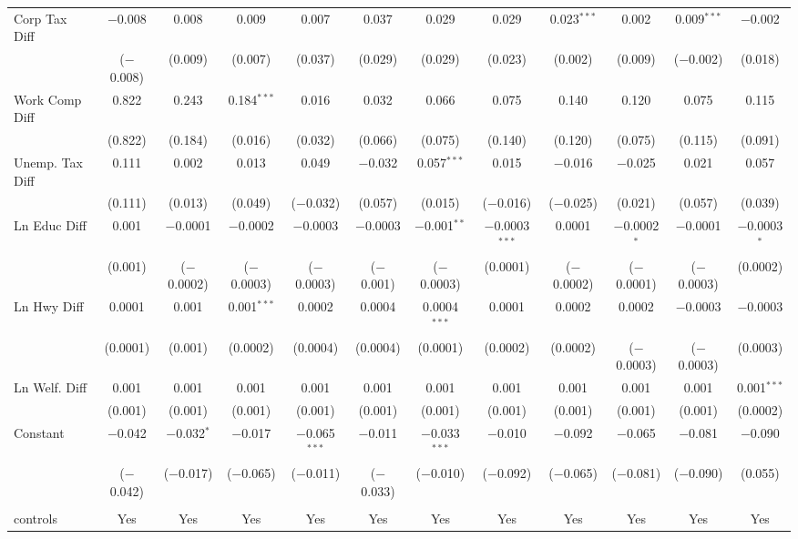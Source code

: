 \begin{table}[!htbp]
\begin{tabular}{@{\extracolsep{5pt}}lccccccccccc}
  Corp Tax Diff & $-$0.008 & 0.008 & 0.009 & 0.007 & 0.037 & 0.029 & 0.029 & 0.023$^{***}$ & 0.002 & 0.009$^{***}$ & $-$0.002 \\ 
  & ($-$0.008) & (0.009) & (0.007) & (0.037) & (0.029) & (0.029) & (0.023) & (0.002) & (0.009) & ($-$0.002) & (0.018) \\ 
  Work Comp Diff & 0.822 & 0.243 & 0.184$^{***}$ & 0.016 & 0.032 & 0.066 & 0.075 & 0.140 & 0.120 & 0.075 & 0.115 \\ 
  & (0.822) & (0.184) & (0.016) & (0.032) & (0.066) & (0.075) & (0.140) & (0.120) & (0.075) & (0.115) & (0.091) \\ 
  Unemp. Tax Diff & 0.111 & 0.002 & 0.013 & 0.049 & $-$0.032 & 0.057$^{***}$ & 0.015 & $-$0.016 & $-$0.025 & 0.021 & 0.057 \\ 
  & (0.111) & (0.013) & (0.049) & ($-$0.032) & (0.057) & (0.015) & ($-$0.016) & ($-$0.025) & (0.021) & (0.057) & (0.039) \\ 
  Ln Educ Diff & 0.001 & $-$0.0001 & $-$0.0002 & $-$0.0003 & $-$0.0003 & $-$0.001$^{**}$ & $-$0.0003$^{***}$ & 0.0001 & $-$0.0002$^{*}$ & $-$0.0001 & $-$0.0003$^{*}$ \\ 
  & (0.001) & ($-$0.0002) & ($-$0.0003) & ($-$0.0003) & ($-$0.001) & ($-$0.0003) & (0.0001) & ($-$0.0002) & ($-$0.0001) & ($-$0.0003) & (0.0002) \\ 
  Ln Hwy Diff & 0.0001 & 0.001 & 0.001$^{***}$ & 0.0002 & 0.0004 & 0.0004$^{***}$ & 0.0001 & 0.0002 & 0.0002 & $-$0.0003 & $-$0.0003 \\ 
  & (0.0001) & (0.001) & (0.0002) & (0.0004) & (0.0004) & (0.0001) & (0.0002) & (0.0002) & ($-$0.0003) & ($-$0.0003) & (0.0003) \\ 
  Ln Welf. Diff & 0.001 & 0.001 & 0.001 & 0.001 & 0.001 & 0.001 & 0.001 & 0.001 & 0.001 & 0.001 & 0.001$^{***}$ \\ 
  & (0.001) & (0.001) & (0.001) & (0.001) & (0.001) & (0.001) & (0.001) & (0.001) & (0.001) & (0.001) & (0.0002) \\ 
  Constant & $-$0.042 & $-$0.032$^{*}$ & $-$0.017 & $-$0.065$^{***}$ & $-$0.011 & $-$0.033$^{***}$ & $-$0.010 & $-$0.092 & $-$0.065 & $-$0.081 & $-$0.090 \\ 
  & ($-$0.042) & ($-$0.017) & ($-$0.065) & ($-$0.011) & ($-$0.033) & ($-$0.010) & ($-$0.092) & ($-$0.065) & ($-$0.081) & ($-$0.090) & (0.055) \\ 
 \hline \\[-1.8ex] 
controls & Yes & Yes & Yes & Yes & Yes & Yes & Yes & Yes & Yes & Yes & Yes \\ 

\end{tabular}
\end{table}
